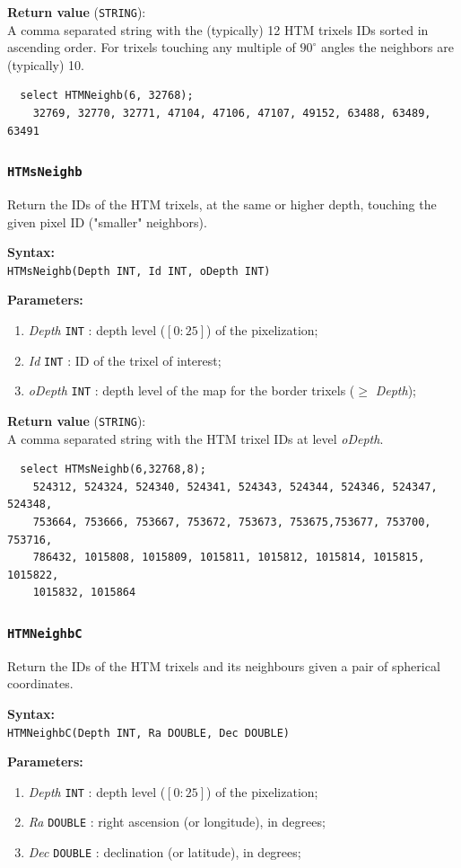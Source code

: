 \documentclass[10pt,titlepage]{article}
\def\deg{^\circ}
\newcommand{\syntax}[1]
{
  \bigskip
  \noindent
  \textbf{Syntax:} \\ 
  \indent \texttt{#1}
}
\newenvironment{parameters}
{
  \medskip
  \noindent
  \textbf{Parameters:}
  \begin{enumerate}
}
{
  \end{enumerate}
}
\newcommand{\param}[2]
{
  \item \textit{#1} \texttt{#2} 
}
\newcommand{\return}[1]
{
  \medskip
  \noindent
  \textbf{Return value} (\texttt{#1}): \\
  \indent
}
\newcommand{\example}
{
\medskip
\noindent{\textbf{Example:}}
}
\begin{document}
\return{STRING} A comma separated string with the (typically) 12 HTM trixels
IDs sorted in ascending order. For trixels touching any multiple of $90\deg$
angles the neighbors are (typically) 10.

\example
%
\begin{verbatim}
  select HTMNeighb(6, 32768);
    32769, 32770, 32771, 47104, 47106, 47107, 49152, 63488, 63489, 63491
\end{verbatim}
%
%

\subsubsection{{\tt HTMsNeighb}}
Return the IDs of the HTM trixels, at the same or higher depth, touching the
given pixel ID ("smaller" neighbors).

\syntax{HTMsNeighb(Depth INT, Id INT, oDepth INT)}

\begin{parameters}
  \param{Depth}{INT}: depth level ($[0:25]$) of the pixelization;
  \param{Id}{INT}: ID of the trixel of interest;
  \param{oDepth}{INT}: depth level of the map for the border trixels ($\ge$ \emph{Depth});
\end{parameters}

\return{STRING} A comma separated string with the HTM trixel IDs at level \emph{oDepth}.

\example
%
\begin{verbatim}
  select HTMsNeighb(6,32768,8);
    524312, 524324, 524340, 524341, 524343, 524344, 524346, 524347, 524348,
    753664, 753666, 753667, 753672, 753673, 753675,753677, 753700, 753716,
    786432, 1015808, 1015809, 1015811, 1015812, 1015814, 1015815, 1015822,
    1015832, 1015864
\end{verbatim}
%
%

\subsubsection{{\tt HTMNeighbC}}
Return the IDs of the HTM trixels and its neighbours given a pair of
spherical coordinates.

\syntax{HTMNeighbC(Depth INT, Ra DOUBLE, Dec DOUBLE)}

\begin{parameters}
  \param{Depth}{INT}: depth level ($[0:25]$) of the pixelization;
  \param{Ra}{DOUBLE}: right ascension (or longitude), in degrees;
  \param{Dec}{DOUBLE}: declination (or latitude), in degrees;
\end{parameters}
\end{document}
